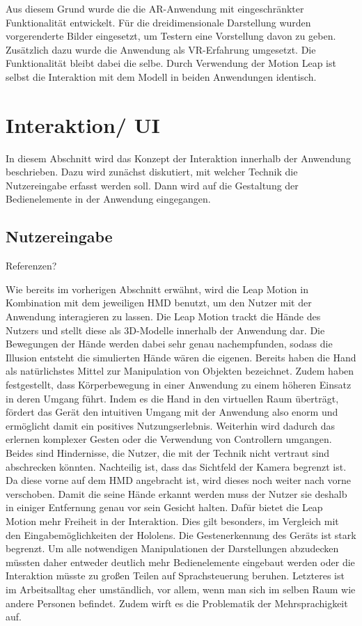 Aus diesem Grund wurde die die AR-Anwendung mit eingeschränkter Funktionalität entwickelt. Für die dreidimensionale Darstellung wurden vorgerenderte Bilder eingesetzt, um Testern eine Vorstellung davon zu geben.
Zusätzlich dazu wurde die Anwendung als VR-Erfahrung umgesetzt. Die Funktionalität bleibt dabei die selbe. 
Durch Verwendung der Motion Leap ist selbst die Interaktion mit dem Modell in beiden Anwendungen identisch. 



\section{Interaktion/ UI } 

In diesem Abschnitt wird das Konzept der Interaktion innerhalb der Anwendung beschrieben. Dazu wird zunächst diskutiert, mit welcher Technik die Nutzereingabe erfasst werden soll. Dann wird auf die Gestaltung der Bedienelemente in der Anwendung eingegangen.

\subsection{Nutzereingabe}
Referenzen?

Wie bereits im vorherigen Abschnitt erwähnt, wird die Leap Motion in Kombination mit dem jeweiligen HMD benutzt, um den Nutzer mit der Anwendung interagieren zu lassen. 
Die Leap Motion trackt die Hände des Nutzers und stellt diese als 3D-Modelle innerhalb der Anwendung dar. Die Bewegungen der Hände werden dabei sehr genau nachempfunden, sodass die Illusion entsteht die simulierten Hände wären die eigenen. 
Bereits \citet{Zimmerman86} haben die Hand als natürlichstes Mittel zur Manipulation von Objekten bezeichnet. Zudem haben \citet{Bianchi-Berthouze07} festgestellt, dass Körperbewegung in einer Anwendung zu einem höheren Einsatz in deren Umgang führt. Indem es die Hand in den virtuellen Raum überträgt, fördert das Gerät den intuitiven Umgang mit der Anwendung also enorm und ermöglicht damit ein positives Nutzungserlebnis. Weiterhin wird dadurch das erlernen komplexer Gesten oder die Verwendung von Controllern umgangen. Beides sind Hindernisse, die Nutzer, die mit der Technik nicht vertraut sind abschrecken könnten. 
Nachteilig ist, dass das Sichtfeld der Kamera begrenzt ist. Da diese vorne auf dem HMD angebracht ist, wird dieses noch weiter nach vorne verschoben. Damit die seine Hände erkannt werden muss der Nutzer sie deshalb in einiger Entfernung genau vor sein Gesicht halten. 
Dafür bietet die Leap Motion mehr Freiheit in der Interaktion. Dies gilt besonders, im Vergleich mit den Eingabemöglichkeiten der Hololens. 
Die Gestenerkennung des Geräts ist stark begrenzt. Um alle notwendigen Manipulationen der Darstellungen abzudecken müssten daher entweder deutlich mehr Bedienelemente eingebaut werden oder die Interaktion müsste zu großen Teilen auf Sprachsteuerung beruhen. 
Letzteres ist im Arbeitsalltag eher umständlich, vor allem, wenn man sich im selben Raum wie andere Personen befindet. Zudem wirft es die Problematik der Mehrsprachigkeit auf. 

